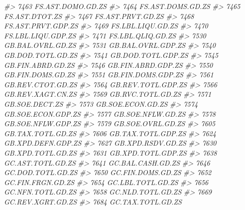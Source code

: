 \documentclass[
]{bxjsbook}
\newenvironment{Shaded}{\begin{snugshade}}{\end{snugshade}}
\newcommand{\CommentTok}[1]{\textcolor[rgb]{0.56,0.35,0.01}{\textit{#1}}}
\theoremstyle{definition}
\theoremstyle{definition}
\theoremstyle{definition}
\theoremstyle{definition}
\theoremstyle{remark}
\begin{document}
\begin{Shaded}
\begin{Highlighting}[]
\CommentTok{\#\textgreater{} 7463           FS.AST.DOMO.GD.ZS}
\CommentTok{\#\textgreater{} 7464           FS.AST.DOMS.GD.ZS}
\CommentTok{\#\textgreater{} 7465              FS.AST.DTOT.ZS}
\CommentTok{\#\textgreater{} 7467           FS.AST.PRVT.GD.ZS}
\CommentTok{\#\textgreater{} 7468          FS.AST.PRVT.GDP.ZS}
\CommentTok{\#\textgreater{} 7469           FS.LBL.LIQU.GD.ZS}
\CommentTok{\#\textgreater{} 7470          FS.LBL.LIQU.GDP.ZS}
\CommentTok{\#\textgreater{} 7471           FS.LBL.QLIQ.GD.ZS}
\CommentTok{\#\textgreater{} 7530           GB.BAL.OVRL.GD.ZS}
\CommentTok{\#\textgreater{} 7531          GB.BAL.OVRL.GDP.ZS}
\CommentTok{\#\textgreater{} 7540           GB.DOD.TOTL.GD.ZS}
\CommentTok{\#\textgreater{} 7541          GB.DOD.TOTL.GDP.ZS}
\CommentTok{\#\textgreater{} 7545           GB.FIN.ABRD.GD.ZS}
\CommentTok{\#\textgreater{} 7546          GB.FIN.ABRD.GDP.ZS}
\CommentTok{\#\textgreater{} 7550           GB.FIN.DOMS.GD.ZS}
\CommentTok{\#\textgreater{} 7551          GB.FIN.DOMS.GDP.ZS}
\CommentTok{\#\textgreater{} 7561           GB.REV.CTOT.GD.ZS}
\CommentTok{\#\textgreater{} 7564          GB.REV.TOTL.GDP.ZS}
\CommentTok{\#\textgreater{} 7566           GB.REV.XAGT.CN.ZS}
\CommentTok{\#\textgreater{} 7569           GB.RVC.TOTL.GD.ZS}
\CommentTok{\#\textgreater{} 7571              GB.SOE.DECT.ZS}
\CommentTok{\#\textgreater{} 7573           GB.SOE.ECON.GD.ZS}
\CommentTok{\#\textgreater{} 7574          GB.SOE.ECON.GDP.ZS}
\CommentTok{\#\textgreater{} 7577           GB.SOE.NFLW.GD.ZS}
\CommentTok{\#\textgreater{} 7578          GB.SOE.NFLW.GDP.ZS}
\CommentTok{\#\textgreater{} 7579           GB.SOE.OVRL.GD.ZS}
\CommentTok{\#\textgreater{} 7605           GB.TAX.TOTL.GD.ZS}
\CommentTok{\#\textgreater{} 7606          GB.TAX.TOTL.GDP.ZS}
\CommentTok{\#\textgreater{} 7624          GB.XPD.DEFN.GDP.ZS}
\CommentTok{\#\textgreater{} 7627           GB.XPD.RSDV.GD.ZS}
\CommentTok{\#\textgreater{} 7630           GB.XPD.TOTL.GD.ZS}
\CommentTok{\#\textgreater{} 7631          GB.XPD.TOTL.GDP.ZS}
\CommentTok{\#\textgreater{} 7638           GC.AST.TOTL.GD.ZS}
\CommentTok{\#\textgreater{} 7641           GC.BAL.CASH.GD.ZS}
\CommentTok{\#\textgreater{} 7646           GC.DOD.TOTL.GD.ZS}
\CommentTok{\#\textgreater{} 7650           GC.FIN.DOMS.GD.ZS}
\CommentTok{\#\textgreater{} 7652           GC.FIN.FRGN.GD.ZS}
\CommentTok{\#\textgreater{} 7654           GC.LBL.TOTL.GD.ZS}
\CommentTok{\#\textgreater{} 7656           GC.NFN.TOTL.GD.ZS}
\CommentTok{\#\textgreater{} 7658           GC.NLD.TOTL.GD.ZS}
\CommentTok{\#\textgreater{} 7669           GC.REV.XGRT.GD.ZS}
\CommentTok{\#\textgreater{} 7684           GC.TAX.TOTL.GD.ZS}

\end{Highlighting}
\end{Shaded}
\end{document}
